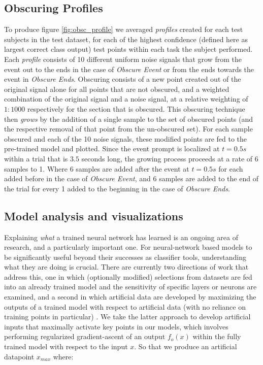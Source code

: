 \documentclass[fleqn,10pt]{wlscirep}
\begin{document}
\subsection*{Obscuring Profiles}

To produce figure \ref{fig:obsc_profile} we averaged {\em profiles} created for each test subjects in the test dataset, for each of the highest confidence (defined here as largest correct class output) test points within each task the subject performed. Each {\em profile} consists of 10 different uniform noise signals that grow from the event out to the ends in the case of {\em Obscure Event} or from the ends towards the event in {\em Obscure Ends}. Obscuring consists of a new point created out of the original signal alone for all points that are not obscured, and a weighted combination of the original signal and a noise signal, at a relative weighting of $1:1000$ respectively for the section that is obscured. This obscuring technique then {\em grows} by the addition of a single sample to the set of obscured points (and the respective removal of that point from the un-obscured set). For each sample obscured and each of the 10 noise signals, these modified points are fed to the pre-trained model and plotted. Since the event prompt is localized at $t=0.5s$ within a trial that is $3.5$ seconds long, the growing process proceeds at a rate of 6 samples to 1. Where 6 samples are added after the event at $t=0.5s$ for each added before in the case of {\em Obscure Event}, and 6 samples are added to the end of the trial for every 1 added to the beginning in the case of {\em Obscure Ends}.

\subsection*{Model analysis and visualizations} \label{sec:max_act}

Explaining {\em what} a trained neural network has learned is an ongoing area of research, and a particularly important one. For neural-network based models to be significantly useful beyond their successes as classifier tools, understanding what they are doing is crucial. There are currently two directions of work that address this, one in which (optionally modified) selections from datasets are fed into an already trained model and the sensitivity of specific layers or neurons are examined, and a second in which artificial data are developed by maximizing the outputs of a trained model with respect to artificial data (with no reliance on training points in particular) \cite{Yosinski2015}. We take the latter approach to develop artificial inputs that maximally activate key points in our models, which involves performing regularized gradient-ascent of an output $f_o(x)$ within the fully trained model with respect to the input $x$. So that we produce an artificial datapoint $x_{max}$ where:
\end{document}

